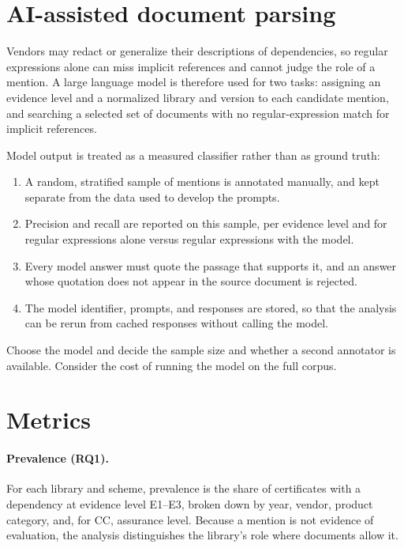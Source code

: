 \section{AI-assisted document parsing}
\label{sec:ai}

Vendors may redact or generalize their descriptions of dependencies, so regular
expressions alone can miss implicit references and cannot judge the role of a
mention. A large language model is therefore used for two tasks: assigning an
evidence level and a normalized library and version to each candidate mention,
and searching a selected set of documents with no regular-expression match for
implicit references.

Model output is treated as a measured classifier rather than as ground truth:

\begin{enumerate}
  \item A random, stratified sample of mentions is annotated manually, and
    kept separate from the data used to develop the prompts.
  \item Precision and recall are reported on this sample, per evidence level and
    for regular expressions alone versus regular expressions with the model.
  \item Every model answer must quote the passage that supports it, and an
    answer whose quotation does not appear in the source document is rejected.
  \item The model identifier, prompts, and responses are stored, so that the
    analysis can be rerun from cached responses without calling the model.
\end{enumerate}

{Choose the model and decide the sample size and whether a second annotator
is available. Consider the cost of running the model on the full corpus.}

\section{Metrics}
\label{sec:metrics}

\paragraph{Prevalence (RQ1).} For each library and scheme, prevalence is the share of
certificates with a dependency at evidence level E1--E3, broken down by year,
vendor, product category, and, for CC, assurance level. Because a mention is not
evidence of evaluation, the analysis distinguishes the library's role where
documents allow it.

